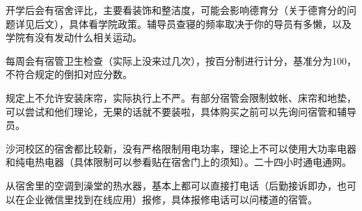 
开学后会有宿舍评比，主要看装饰和整洁度，可能会影响德育分（关于德育分的问题详见后文），具体看学院政策。辅导员查寝的频率取决于你的导员有多懒，以及学院有没有发动什么相关运动。

每周会有宿管卫生检查（实际上没来过几次），按百分制进行计分，基准分为100，不符合规定的倒扣对应分数。


规定上不允许安装床帘，实际执行上不严。有部分宿管会限制蚊帐、床帘和地垫，可以尝试和他们理论，无果的话就不要装啦，具体购买之前可以先询问宿管和辅导员。


沙河校区的宿舍都比较新，没有严格限制用电功率，理论上不可以使用大功率电器和纯电热电器（具体限制可以参看贴在宿舍门上的须知）。二十四小时通电通网。


从宿舍里的空调到澡堂的热水器，基本上都可以直接打电话（后勤接诉即办，也可以在企业微信里找到在线应用）报修，具体报修电话可以问楼道的宿管。
